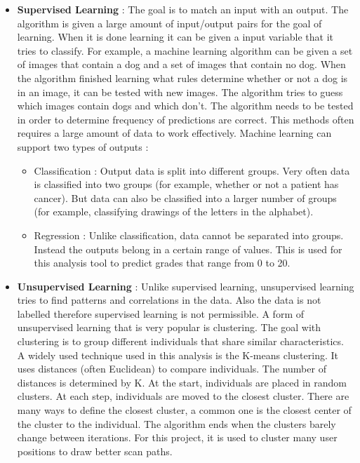\documentclass[a4paper,11pt]{report}
\numberwithin{figure}{section} %
\begin{document}
    \begin{itemize}
        \item[\textbullet] \textbf{Supervised Learning} : The goal is to match an input with an output.
        The algorithm is given a large amount of input/output pairs for the goal of learning.
        When it is done learning it can be given a input variable that it tries to classify.
        For example, a machine learning algorithm can be given a set of images that contain a dog and a set of images that contain no dog.
        When the algorithm finished learning what rules determine whether or not a dog is in an image, it can be tested with new images.
        The algorithm tries to guess which images contain dogs and which don't.
        The algorithm needs to be tested in order to determine frequency of predictions are correct.
        This methods often requires a large amount of data to work effectively.
        Machine learning can support two types of outputs :
        \begin{itemize}
            \item Classification : Output data is split into different groups.
            Very often data is classified into two groups (for example, whether or not a patient has cancer).
            But data can also be classified into a larger number of groups (for example, classifying drawings of the letters in the alphabet).
            \item Regression : Unlike classification, data cannot be separated into groups.
            Instead the outputs belong in a certain range of values.
            This is used for this analysis tool to predict grades that range from 0 to 20.
        \end{itemize}
        \item[\textbullet] \textbf{Unsupervised Learning} : Unlike supervised learning, unsupervised learning tries to find patterns and correlations in the data.
        Also the data is not labelled therefore supervised learning is not permissible.
        A form of unsupervised learning that is very popular is clustering.
        The goal with clustering is to group different individuals that share similar characteristics.
        A widely used technique used in this analysis is the K-means clustering.
        It uses distances (often Euclidean) to compare individuals.
        The number of distances is determined by K.
        At the start, individuals are placed in random clusters.
        At each step, individuals are moved to the closest cluster.
        There are many ways to define the closest cluster, a common one is the closest center of the cluster to the individual.
        The algorithm ends when the clusters barely change between iterations.
        For this project, it is used to cluster many user positions to draw better scan paths.
    \end{itemize}
\end{document}
